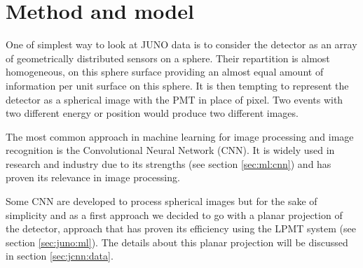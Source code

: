 \section{Method and model}

One of simplest way to look at JUNO data is to consider the detector as an array of geometrically distributed sensors on a sphere. Their repartition is almost homogeneous, on this sphere surface providing an almost equal amount of information per unit surface on this sphere. It is then tempting to represent the detector as a spherical image with the PMT in place of pixel. Two events with two different energy or position would produce two different images.

The most common approach in machine learning for image processing and image recognition is the Convolutional Neural Network (CNN). It is widely used in research and industry \cite{simonyan_very_2015, ciresan_multi-column_2012, abbasi_convolutional_2021, maksimovic_cnns_2021} due to its strengths (see section \ref{sec:ml:cnn}) and has proven its relevance in image processing.

Some CNN are developed to process spherical images \cite{cohen_spherical_2018} but for the sake of simplicity and as a first approach we decided to go with a planar projection of the detector, approach that has proven its efficiency using the LPMT system (see section \ref{sec:juno:ml}). The details about this planar projection will be discussed in section \ref{sec:jcnn:data}.

